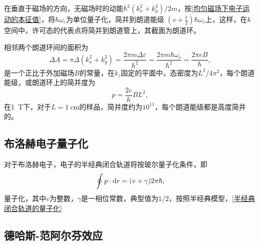             在垂直于磁场的方向，无磁场时的动能$\hbar^2(k_x^2+k_y^2)/2m$，按\autoref{均匀磁场下电子运动的本征值}，将$\hbar\omega_c$为单位量子化，简并到朗道能级
            $\left( v+\frac{1}{2} \right)\hbar\omega_c$上，这样，在$k$空间中，许可态的代表点将简并到朗道管上，其截面为朗道环。

            相邻两个朗道环间的面积为
            \begin{equation}
                \Delta A =\pi\Delta(k_x^2+k_y^2)=\frac{2\pi m\Delta\varepsilon}{\hbar^2}=\frac{2\pi m\hbar\omega_c}{\hbar^2}=\frac{2\pi eB}{\hbar},
            \end{equation}
            是一个正比于外加磁场$B$的常量，在$k_z$固定的平面中，态密度为$L^2/4\pi^2$，每个朗道能级，或朗道环上的简并度为
            \begin{equation}
                p=\frac{2e}{h}BL^2,
            \end{equation}
            在\SI{1}{\tesla}下，对于$L=\SI{1}{\cm}$的样品，简并度约为$10^{11}$，每个朗道能级都是高度简并的。
        \subsection{布洛赫电子量子化}
            对于布洛赫电子，电子的半经典闭合轨道将按玻尔量子化条件，即
            \begin{equation}
                \oint p\cdot\mathop{}\!\mathrm{d} r=(v+\gamma)2\pi\hbar\label{半经典闭合轨道的量子化},
            \end{equation}
            量子化，其中$v$为整数，$\gamma$是一相位常数，典型值为$1/2$，按照半经典模型，\autoref{半经典闭合轨道的量子化}
        \subsection{德哈斯-范阿尔芬效应}
        
